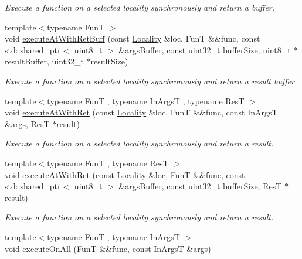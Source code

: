 \begin{DoxyCompactItemize}
\begin{DoxyCompactList}\small\item\em Execute a function on a selected locality synchronously and return a buffer. \end{DoxyCompactList}\item 
{\footnotesize template$<$typename Fun\-T $>$ }\\void \hyperlink{namespaceshad_1_1rt_a9a77fcd35f06e3e2200ee1ca940ba8d1}{execute\-At\-With\-Ret\-Buff} (const \hyperlink{classshad_1_1rt_1_1Locality}{Locality} \&loc, Fun\-T \&\&func, const std\-::shared\-\_\-ptr$<$ uint8\-\_\-t $>$ \&args\-Buffer, const uint32\-\_\-t buffer\-Size, uint8\-\_\-t $\ast$result\-Buffer, uint32\-\_\-t $\ast$result\-Size)
\begin{DoxyCompactList}\small\item\em Execute a function on a selected locality synchronously and return a result buffer. \end{DoxyCompactList}\item 
{\footnotesize template$<$typename Fun\-T , typename In\-Args\-T , typename Res\-T $>$ }\\void \hyperlink{namespaceshad_1_1rt_a750ac93a8d339b97e3a11e182b50ffbc}{execute\-At\-With\-Ret} (const \hyperlink{classshad_1_1rt_1_1Locality}{Locality} \&loc, Fun\-T \&\&func, const In\-Args\-T \&args, Res\-T $\ast$result)
\begin{DoxyCompactList}\small\item\em Execute a function on a selected locality synchronously and return a result. \end{DoxyCompactList}\item 
{\footnotesize template$<$typename Fun\-T , typename Res\-T $>$ }\\void \hyperlink{namespaceshad_1_1rt_aa1c240408fd99868fe25dc35e78c9c79}{execute\-At\-With\-Ret} (const \hyperlink{classshad_1_1rt_1_1Locality}{Locality} \&loc, Fun\-T \&\&func, const std\-::shared\-\_\-ptr$<$ uint8\-\_\-t $>$ \&args\-Buffer, const uint32\-\_\-t buffer\-Size, Res\-T $\ast$result)
\begin{DoxyCompactList}\small\item\em Execute a function on a selected locality synchronously and return a result. \end{DoxyCompactList}\item 
{\footnotesize template$<$typename Fun\-T , typename In\-Args\-T $>$ }\\void \hyperlink{namespaceshad_1_1rt_aeff4031b9c8382aa34ec65c853cf45b8}{execute\-On\-All} (Fun\-T \&\&func, const In\-Args\-T \&args)

\end{DoxyCompactItemize}
